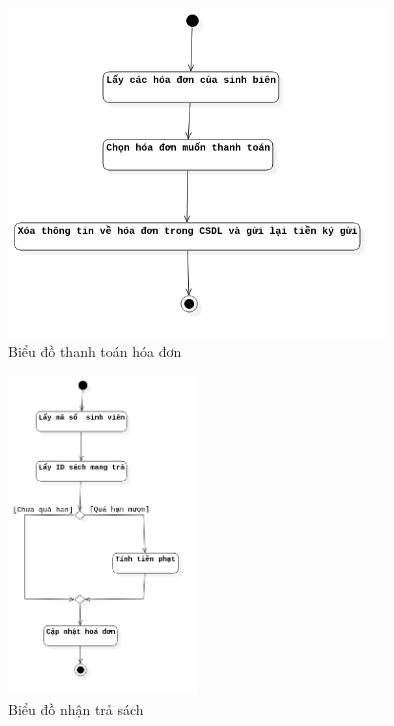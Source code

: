\documentclass[../report.tex]{subfiles}
\begin{document}
\begin{figure}[H]
\centering
\includegraphics[width=10cm]{figures/thanhtoan.png}
\caption{Biểu đồ thanh toán hóa đơn}
\end{figure}

\begin{figure}[H]
\centering
\includegraphics[width=5cm]{figures/nhantrasach.png}
\caption{Biểu đồ nhận trả sách}
\end{figure}
\end{document}
